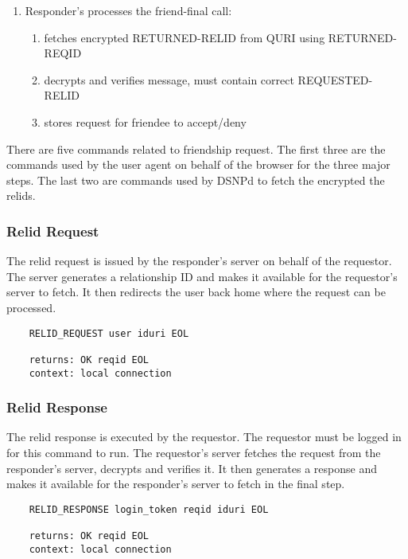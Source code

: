 \documentclass[letterpaper,11pt,oneside]{article}
\begin{document}
\begin{enumerate}
\item Responder's processes the friend-final call:
    \begin{enumerate}
    \item fetches encrypted RETURNED-RELID from QURI using RETURNED-REQID
    \item decrypts and verifies message, must contain correct REQUESTED-RELID
    \item stores request for friendee to accept/deny
    \end{enumerate}
\end{enumerate}

There are five commands related to friendship request. The first three are the
commands used by the user agent on behalf of the browser for the three major
steps. The last two are commands used by DSNPd to fetch the encrypted the
relids.

\subsubsection{Relid Request}

The relid request is issued by the responder's server on behalf of the
requestor. The server generates a relationship ID and makes it available for
the requestor's server to fetch. It then redirects the user back home where the
request can be processed.

\vspace{10pt}
\begin{verbatim}
    RELID_REQUEST user iduri EOL

    returns: OK reqid EOL
    context: local connection
\end{verbatim}
\vspace{10pt}

\subsubsection{Relid Response}

The relid response is executed by the requestor. The requestor must be logged
in for this command to run. The requestor's server fetches the request from the
responder's server, decrypts and verifies it. It then generates a response and
makes it available for the responder's server to fetch in the final step.

\vspace{10pt}
\begin{verbatim}
    RELID_RESPONSE login_token reqid iduri EOL

    returns: OK reqid EOL
    context: local connection
\end{verbatim}
\vspace{10pt}
\end{document}
